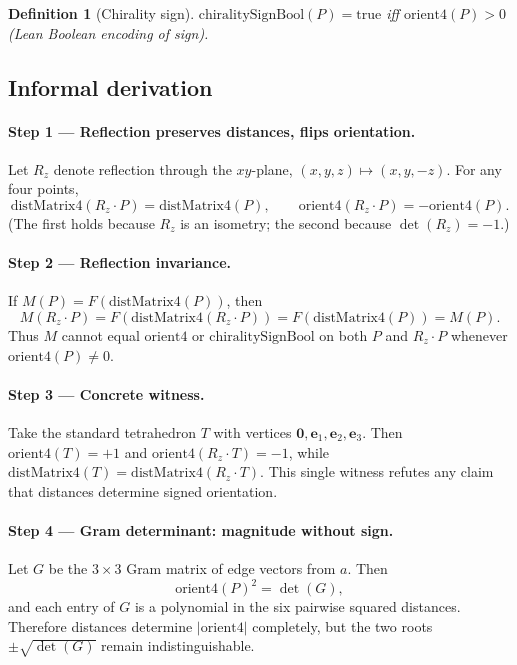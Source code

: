 \documentclass[11pt]{article}
\newtheorem{definition}{Definition}
\begin{document}
\begin{definition}[Chirality sign]
$\mathrm{chiralitySignBool}(P)=\mathrm{true}$ iff $\mathrm{orient4}(P)>0$ (Lean Boolean encoding of sign).
\end{definition}

\subsection{Informal derivation}

\paragraph{Step 1 --- Reflection preserves distances, flips orientation.}
Let $R_z$ denote reflection through the $xy$-plane, $(x,y,z)\mapsto(x,y,-z)$. For any four points,
\[
\mathrm{distMatrix4}(R_z\cdot P)=\mathrm{distMatrix4}(P),
\qquad
\mathrm{orient4}(R_z\cdot P)=-\mathrm{orient4}(P).
\]
(The first holds because $R_z$ is an isometry; the second because $\det(R_z)=-1$.)

\paragraph{Step 2 --- Reflection invariance.}
If $M(P)=F(\mathrm{distMatrix4}(P))$, then
\[
M(R_z\cdot P)=F(\mathrm{distMatrix4}(R_z\cdot P))=F(\mathrm{distMatrix4}(P))=M(P).
\]
Thus $M$ cannot equal $\mathrm{orient4}$ or $\mathrm{chiralitySignBool}$ on both $P$ and $R_z\cdot P$ whenever $\mathrm{orient4}(P)\neq0$.

\paragraph{Step 3 --- Concrete witness.}
Take the standard tetrahedron $T$ with vertices $\mathbf{0},\mathbf{e}_1,\mathbf{e}_2,\mathbf{e}_3$. Then $\mathrm{orient4}(T)=+1$ and $\mathrm{orient4}(R_z\cdot T)=-1$, while $\mathrm{distMatrix4}(T)=\mathrm{distMatrix4}(R_z\cdot T)$. This single witness refutes any claim that distances determine signed orientation.

\paragraph{Step 4 --- Gram determinant: magnitude without sign.}
Let $G$ be the $3\times3$ Gram matrix of edge vectors from $a$. Then
\begin{equation}
\mathrm{orient4}(P)^2=\det(G),
\end{equation}
and each entry of $G$ is a polynomial in the six pairwise squared distances. Therefore distances determine $|\mathrm{orient4}|$ completely, but the two roots $\pm\sqrt{\det(G)}$ remain indistinguishable.
\end{document}
